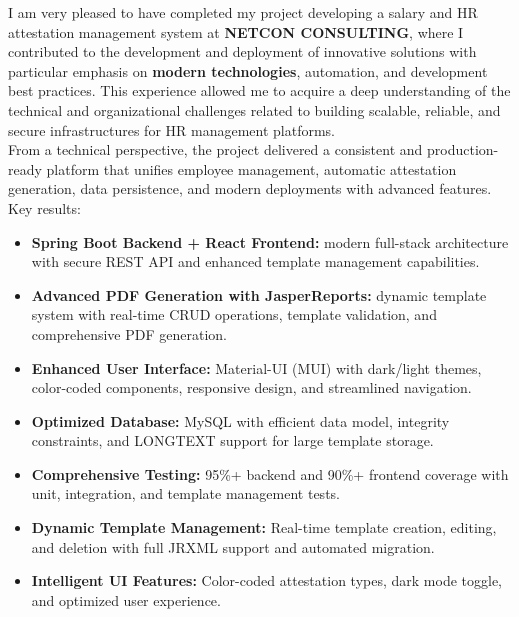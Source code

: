 \documentclass[a4paper,12pt]{report}
\begin{document}
\renewcommand{\headrulewidth}{1pt}
\fancyhead[L]{\hspace*{4cm}}

\begin{doublespace}
I am very pleased to have completed my project developing a salary and HR attestation management system at \textbf{NETCON CONSULTING}, where I contributed to the development and deployment of innovative solutions with particular emphasis on \textbf{modern technologies}, automation, and development best practices. This experience allowed me to acquire a deep understanding of the technical and organizational challenges related to building scalable, reliable, and secure infrastructures for HR management platforms.\\

From a technical perspective, the project delivered a consistent and production-ready platform that unifies employee management, automatic attestation generation, data persistence, and modern deployments with advanced features. Key results:\\
\begin{itemize}
    \item \textbf{Spring Boot Backend + React Frontend:} modern full-stack architecture with secure REST API and enhanced template management capabilities.
    \item \textbf{Advanced PDF Generation with JasperReports:} dynamic template system with real-time CRUD operations, template validation, and comprehensive PDF generation.
    \item \textbf{Enhanced User Interface:} Material-UI (MUI) with dark/light themes, color-coded components, responsive design, and streamlined navigation.
    \item \textbf{Optimized Database:} MySQL with efficient data model, integrity constraints, and LONGTEXT support for large template storage.
    \item \textbf{Comprehensive Testing:} 95\%+ backend and 90\%+ frontend coverage with unit, integration, and template management tests.
    \item \textbf{Dynamic Template Management:} Real-time template creation, editing, and deletion with full JRXML support and automated migration.
    \item \textbf{Intelligent UI Features:} Color-coded attestation types, dark mode toggle, and optimized user experience.
\end{itemize}


\end{doublespace}
\end{document}
